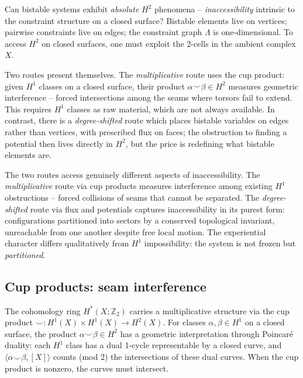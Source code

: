\documentclass[11pt]{amsart}  %
\theoremstyle{plain}
\theoremstyle{definition}
\theoremstyle{remark}
\newcommand{\style}[1]{{\em #1}} %
\newcommand{\Z}{\mathbb{Z}} %
\newcommand{\cgraph}{\Lambda} %
\begin{document}
Can bistable systems exhibit \emph{absolute} $H^2$ phenomena -- \style{inaccessibility} 
intrinsic to the constraint structure on a closed surface?
Bistable elements live on vertices; 
pairwise constraints live on edges; the constraint graph $\cgraph$ is 
one-dimensional. 
To access $H^2$ on closed surfaces, one must exploit the 2-cells in the ambient complex $X$. 

Two routes present themselves. The \emph{multiplicative} route uses the cup product: given $H^1$ 
classes on a closed surface, their product $\alpha \smile \beta \in H^2$ measures 
geometric interference -- forced intersections among the seams where torsors 
fail to extend. This requires $H^1$ classes as raw material, which are not always available. In contrast, there is a 
\emph{degree-shifted} route which places bistable variables on edges rather than 
vertices, with prescribed flux on faces; the obstruction to finding a potential 
then lives directly in $H^2$, but the price is redefining what bistable elements are.

The two routes access genuinely different aspects of inaccessibility. The \emph{multiplicative} route via cup products measures interference among existing $H^1$ obstructions -- forced collisions of seams that cannot be separated. The \emph{degree-shifted} route via flux and potentials captures inaccessibility in its purest form: configurations partitioned into sectors by a conserved topological invariant, unreachable from one another despite free local motion. The experiential character differs qualitatively from $H^1$ impossibility: the system is not frozen but \emph{partitioned}.


\subsection{Cup products: seam interference}
\label{sec:cup-product}

The cohomology ring $H^*(X; \Z_2)$ carries a multiplicative structure via the 
cup product $\smile: H^1(X) \times H^1(X) \to H^{2}(X)$. For classes 
$\alpha, \beta \in H^1$ on a closed surface, the product $\alpha \smile \beta \in H^2$ has a geometric interpretation through Poincar\'e duality: 
each $H^1$ class has a dual 1-cycle representable by a closed curve, and 
$\langle \alpha \smile \beta, [X] \rangle$ counts (mod 2) the intersections 
of these dual curves. When the cup product is nonzero, the curves must intersect.
\end{document}
